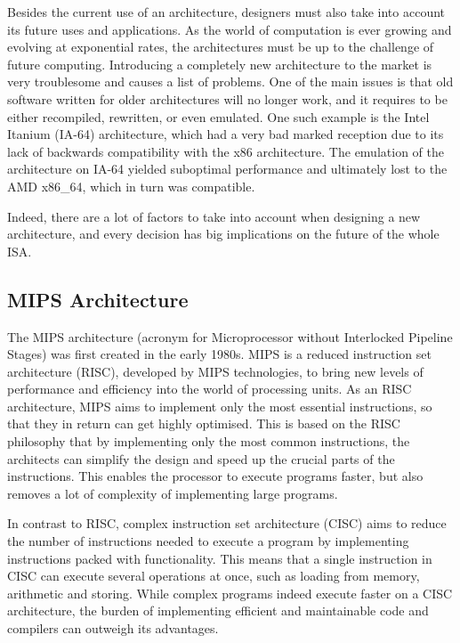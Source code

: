 Besides the current use of an architecture, designers must also take into
account its future uses and applications. As the world of computation is ever
growing and evolving at exponential rates, the architectures must be up to the
challenge of future computing. Introducing a completely new architecture to
the market is very troublesome and causes a list of problems.
One of the main issues is that old software written for older architectures
will no longer work, and it requires to be either recompiled, rewritten,
or even emulated. One such example is the Intel Itanium (IA-64) architecture,
which had a very bad marked reception due to its lack of backwards
compatibility
with the x86 architecture. The emulation of the architecture on IA-64 yielded
suboptimal performance and ultimately lost to the AMD x86\_64, which in
turn was
compatible.\cite{anandtech:1854}

Indeed, there are a lot of factors to take into account when designing a new
architecture, and every decision has big implications on the future of the
whole ISA.

\subsection{MIPS Architecture}
The MIPS architecture (acronym for Microprocessor without Interlocked Pipeline
Stages) was first created in the early 1980s\cite{imgtec:MIPS_Overview}.
MIPS is a reduced instruction set architecture (RISC), developed by MIPS
technologies, to bring new levels of
performance and efficiency into the world of processing units. As an RISC
architecture, MIPS aims to implement only the most essential instructions, so
that they in return can get highly optimised. This is based on the RISC
philosophy that by implementing only the most common instructions, the
architects can simplify the design and speed up the crucial parts of the
instructions. This enables the processor to execute programs faster, but also
removes a lot of complexity of implementing large programs.

In contrast to RISC, complex instruction set architecture (CISC) aims
to reduce the number of instructions needed to execute a program by
implementing instructions packed with functionality. This means that a single
instruction in CISC can execute several operations at once, such as loading
from memory, arithmetic
and storing. While complex programs indeed execute faster on a CISC
architecture,
the burden of implementing efficient and maintainable code and compilers can
outweigh its advantages. \cite{Patterson:1980:CRI:641914.641917}

